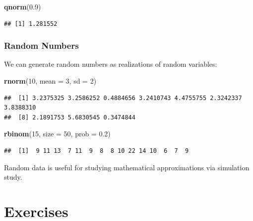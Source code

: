 \documentclass[
]{article}
\newenvironment{Shaded}{\begin{snugshade}}{\end{snugshade}}
\newcommand{\AttributeTok}[1]{\textcolor[rgb]{0.13,0.29,0.53}{#1}}
\newcommand{\DecValTok}[1]{\textcolor[rgb]{0.00,0.00,0.81}{#1}}
\newcommand{\FloatTok}[1]{\textcolor[rgb]{0.00,0.00,0.81}{#1}}
\newcommand{\FunctionTok}[1]{\textcolor[rgb]{0.13,0.29,0.53}{\textbf{#1}}}
\newcommand{\NormalTok}[1]{#1}
\begin{document}
\begin{Shaded}
\begin{Highlighting}[]
\FunctionTok{qnorm}\NormalTok{(}\FloatTok{0.9}\NormalTok{)}
\end{Highlighting}
\end{Shaded}

\begin{verbatim}
## [1] 1.281552
\end{verbatim}

\hypertarget{random-numbers}{%
\subsubsection{Random Numbers}\label{random-numbers}}

We can generate random numbers as realizations of random variables:

\begin{Shaded}
\begin{Highlighting}[]
\FunctionTok{rnorm}\NormalTok{(}\DecValTok{10}\NormalTok{, }\AttributeTok{mean =} \DecValTok{3}\NormalTok{, }\AttributeTok{sd =} \DecValTok{2}\NormalTok{)}
\end{Highlighting}
\end{Shaded}

\begin{verbatim}
##  [1] 3.2375325 3.2586252 0.4884656 3.2410743 4.4755755 2.3242337 3.8388310
##  [8] 2.1891753 5.6830545 0.3474844
\end{verbatim}

\begin{Shaded}
\begin{Highlighting}[]
\FunctionTok{rbinom}\NormalTok{(}\DecValTok{15}\NormalTok{, }\AttributeTok{size =} \DecValTok{50}\NormalTok{, }\AttributeTok{prob =} \FloatTok{0.2}\NormalTok{)}
\end{Highlighting}
\end{Shaded}

\begin{verbatim}
##  [1]  9 11 13  7 11  9  8  8 10 22 14 10  6  7  9
\end{verbatim}

Random data is useful for studying mathematical approximations via
simulation study.

\hypertarget{exercises}{%
\section{Exercises}\label{exercises}}
\end{document}
